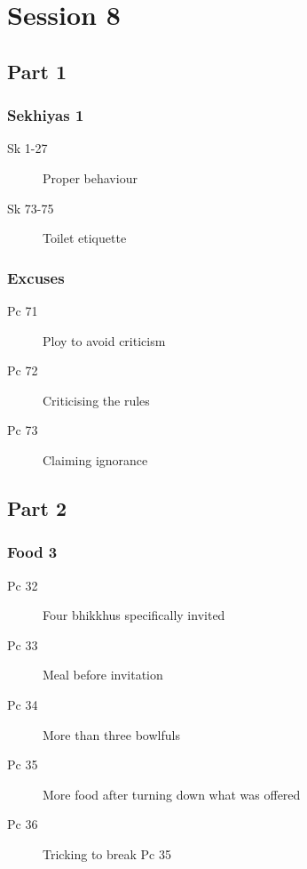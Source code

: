 \documentclass[11pt,oneside]{memoir}
\begin{document}
\chapter{Session 8}

\begin{multicols}{2}

\section{Part 1}

\subsection{Sekhiyas 1}

\begin{description}
\item[Sk 1-27] Proper behaviour
\item[Sk 73-75] Toilet etiquette
\end{description}

\subsection{Excuses}

\begin{description}
\item[Pc 71] Ploy to avoid criticism
\item[Pc 72] Criticising the rules
\item[Pc 73] Claiming ignorance
\end{description}

\columnbreak

\section{Part 2}

\subsection{Food 3}

\begin{description}
\item[Pc 32] Four bhikkhus specifically invited
\item[Pc 33] Meal before invitation
\item[Pc 34] More than three bowlfuls
\item[Pc 35] More food after turning down what was offered
\item[Pc 36] Tricking to break Pc 35
\end{description}


\end{multicols}
\end{document}

